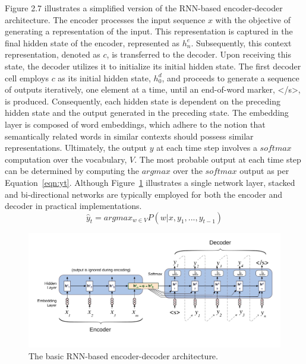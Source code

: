 Figure 2.7 illustrates a simplified version of the RNN-based encoder-decoder architecture. 
The encoder processes the input sequence $x$ with the objective of generating a representation of the input. 
This representation is captured in the final hidden state of the encoder, represented as $h^e_n$. 
Subsequently, this context representation, denoted as $c$, is transferred to the decoder. 
Upon receiving this state, the decoder utilizes it to initialize its initial hidden state. 
The first decoder cell employs $c$ as its initial hidden state, $h^d_0$, and proceeds to generate a sequence of outputs iteratively, one element at a time, until an end-of-word marker, </s>, is produced. 
Consequently, each hidden state is dependent on the preceding hidden state and the output generated in the preceding state. 
The embedding layer is composed of word embeddings, which adhere to the notion that semantically related words in similar contexts should possess similar representations. 
Ultimately, the output $y$ at each time step involves a $softmax$ computation over the vocabulary, $V$. The most probable output at each time step can be determined by computing the $argmax$ over the $softmax$ output as per Equation~\ref{eqn:yt}. 
Although Figure~\ref{fig:rnn-encoder-decoder} illustrates a single network layer, stacked and bi-directional networks are typically employed for both the encoder and decoder in practical implementations.
\begin{equation}
	\hat{y}_t = argmax_{w \in V}P(w|x, y_1, . . . , y_{t-1})
	\label{eqn:yt}
\end{equation}
\begin{figure}[]
	\centering
	\includegraphics[width=1.0\linewidth]{Figures/RNN-Encoder-Decoder}
	\caption{The basic RNN-based encoder-decoder architecture.}
	\label{fig:rnn-encoder-decoder}
\end{figure}

